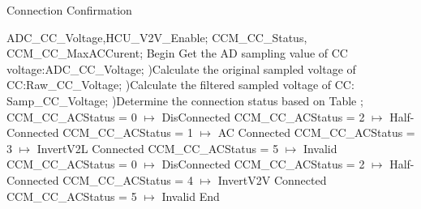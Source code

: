 \begin{algorithm}
    \caption{Connection Confirmation} 
    \label{alg3} 
    \renewcommand{\baselinestretch}{1.5} %
    \selectfont
    \begin{algorithmic}[1] %
        \REQUIRE ADC\_CC\_Voltage,HCU\_V2V\_Enable;
        \ENSURE CCM\_CC\_Status, CCM\_CC\_MaxACCurent;
        \STATE Begin
        \STATE Get the AD sampling value of CC voltage:ADC\_CC\_Voltage;
        )Calculate the original sampled voltage of CC:Raw\_CC\_Voltage;
        )Calculate the filtered sampled voltage of CC: Samp\_CC\_Voltage;
        )Determine the connection status based on Table ;
            \STATE CCM\_CC\_ACStatus = 0 $\mapsto$  DisConnected 
            \STATE CCM\_CC\_ACStatus = 2  $\mapsto$ Half-Connected
            \STATE CCM\_CC\_ACStatus = 1  $\mapsto$ AC Connected
            \STATE CCM\_CC\_ACStatus = 3  $\mapsto$ InvertV2L Connected
        \ELSE
            \STATE CCM\_CC\_ACStatus = 5  $\mapsto$ Invalid
        \ENDIF
                \STATE CCM\_CC\_ACStatus = 0 $\mapsto$  DisConnected 
                \STATE CCM\_CC\_ACStatus = 2  $\mapsto$ Half-Connected
                \STATE CCM\_CC\_ACStatus = 4  $\mapsto$ InvertV2V Connected
            \ELSE
                \STATE CCM\_CC\_ACStatus = 5  $\mapsto$ Invalid
            \ENDIF
        \ENDIF
        \STATE End 
    \end{algorithmic} 
\end{algorithm}